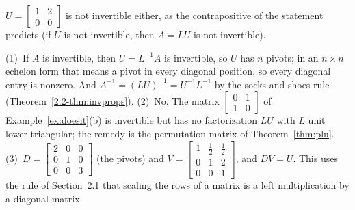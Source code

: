 \documentclass[11pt]{article}
\begin{document}
\begin{description}[leftmargin=0pt,itemsep=5pt]
$U=\begin{bmatrix}1&2\\0&0\end{bmatrix}$ is not invertible either, as the contrapositive of the statement predicts (if $U$ is not invertible, then $A=LU$ is not invertible).
  \item[Before the next section.] (1)~If $A$ is invertible, then $U=L^{-1}A$ is invertible, so $U$ has $n$ pivots; in an $n\times n$ echelon form that means a pivot in every diagonal position, so every diagonal entry is nonzero. And $A^{-1}=(LU)^{-1}=U^{-1}L^{-1}$ by the socks-and-shoes rule (Theorem~\ref{2.2-thm:invprops}). (2)~No. The matrix $\begin{bmatrix}0&1\\1&0\end{bmatrix}$ of Example~\ref{ex:doesit}(b) is invertible but has no factorization $LU$ with $L$ unit lower triangular; the remedy is the permutation matrix of Theorem~\ref{thm:plu}. (3)~$D=\begin{bmatrix}2&0&0\\0&1&0\\0&0&3\end{bmatrix}$ (the pivots) and $V=\begin{bmatrix}1&\tfrac12&\tfrac12\\0&1&2\\0&0&1\end{bmatrix}$, and $DV=U$. This uses the rule of Section~2.1 that scaling the rows of a matrix is a left multiplication by a diagonal matrix.
\end{description}
\end{document}
